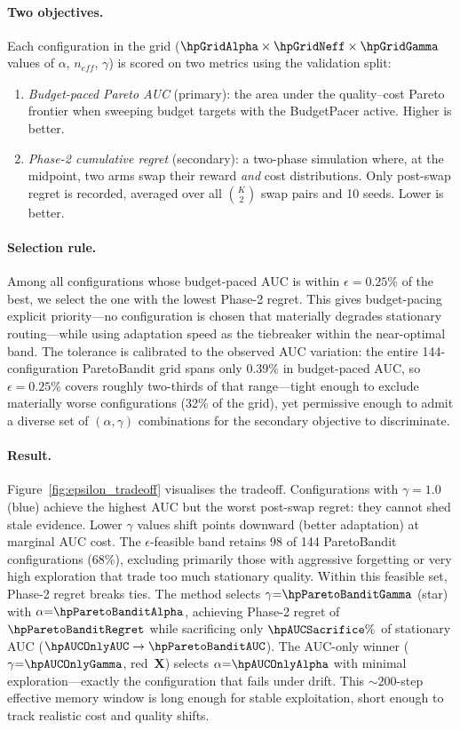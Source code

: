 \paragraph{Two objectives.}
Each configuration in the grid ($\hpGridAlpha \times \hpGridNeff \times \hpGridGamma$ values of $\alpha$, $n_\mathit{eff}$, $\gamma$) is scored on two metrics using the validation split:
\begin{enumerate}[nosep,leftmargin=*]
  \item \emph{Budget-paced Pareto AUC} (primary): the area under the quality--cost Pareto frontier when sweeping budget targets with the BudgetPacer active. Higher is better.
  \item \emph{Phase-2 cumulative regret} (secondary): a two-phase simulation where, at the midpoint, two arms swap their reward \emph{and} cost distributions. Only post-swap regret is recorded, averaged over all $\binom{K}{2}$ swap pairs and 10 seeds. Lower is better.
\end{enumerate}

\paragraph{Selection rule.}
Among all configurations whose budget-paced AUC is within $\epsilon{=}0.25\%$ of the best, we select the one with the lowest Phase-2 regret.  This gives budget-pacing explicit priority---no configuration is chosen that materially degrades stationary routing---while using adaptation speed as the tiebreaker within the near-optimal band.  The tolerance is calibrated to the observed AUC variation: the entire 144-configuration ParetoBandit grid spans only $0.39\%$ in budget-paced AUC, so $\epsilon{=}0.25\%$ covers roughly two-thirds of that range---tight enough to exclude materially worse configurations (32\% of the grid), yet permissive enough to admit a diverse set of $(\alpha, \gamma)$ combinations for the secondary objective to discriminate.

\paragraph{Result.}
Figure~\ref{fig:epsilon_tradeoff} visualises the tradeoff.  Configurations with $\gamma{=}1.0$ (blue) achieve the highest AUC but the worst post-swap regret: they cannot shed stale evidence.  Lower $\gamma$ values shift points downward (better adaptation) at marginal AUC cost.  The $\epsilon$-feasible band retains 98 of 144 ParetoBandit configurations (68\%), excluding primarily those with aggressive forgetting or very high exploration that trade too much stationary quality.  Within this feasible set, Phase-2 regret breaks ties.  The method selects $\gamma{=}\hpParetoBanditGamma$ (star) with $\alpha{=}\hpParetoBanditAlpha$, achieving Phase-2 regret of $\hpParetoBanditRegret$ while sacrificing only $\hpAUCSacrifice\%$ of stationary AUC ($\hpAUCOnlyAUC \to \hpParetoBanditAUC$).  The AUC-only winner ($\gamma{=}\hpAUCOnlyGamma$, red~\textbf{X}) selects $\alpha{=}\hpAUCOnlyAlpha$ with minimal exploration---exactly the configuration that fails under drift.  This ${\sim}200$-step effective memory window is long enough for stable exploitation, short enough to track realistic cost and quality shifts.

